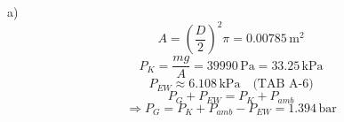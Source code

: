 a) 
\[
A = \left(\frac{D}{2}\right)^2 \pi = 0.00785 \, \text{m}^2
\]
\[
P_K = \frac{m g}{A} = 39990 \, \text{Pa} = 33.25 \, \text{kPa}
\]
\[
P_{EW} \approx 6.108 \, \text{kPa} \quad \text{(TAB A-6)}
\]
\[
P_G + P_{EW} = P_K + P_{amb}
\]
\[
\Rightarrow P_G = P_K + P_{amb} - P_{EW} = 1.394 \, \text{bar}
\]